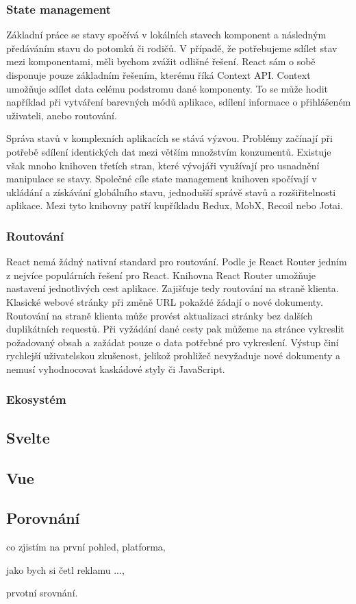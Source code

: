 \subsubsection{State management}

Základní práce se stavy spočívá v lokálních stavech komponent a následným předáváním stavu do potomků či rodičů. 
V případě, že potřebujeme sdílet stav mezi komponentami, měli bychom zvážit odlišné řešení. React sám o sobě disponuje pouze základním řešením, kterému říká Context API. 
Context umožňuje sdílet data celému podstromu dané komponenty. 
To se může hodit například při vytváření barevných módů aplikace, sdílení informace o přihlášeném uživateli, anebo routování.\cite{react}

Správa stavů v komplexních aplikacích se stává výzvou. Problémy začínají při potřebě sdílení identických dat mezi větším množstvím konzumentů. 
Existuje však mnoho knihoven třetích stran, které vývojáři využívají pro usnadnění manipulace se stavy. 
Společné cíle state management knihoven spočívají v ukládání a získávání globálního stavu, jednodušší správě stavů a rozšiřitelnosti aplikace.
Mezi tyto knihovny patří kupříkladu Redux, MobX, Recoil nebo Jotai.\cite{statemanagementreact,reactstatemanagement}

\subsubsection{Routování}

React nemá žádný nativní standard pro routování. Podle \cite{reactbanks} je React Router jedním z nejvíce populárních řešení pro React. 
Knihovna React Router umožňuje nastavení jednotlivých cest aplikace. Zajišťuje tedy routování na straně klienta. 
Klasické webové stránky při změně URL pokaždé žádají o nové dokumenty. Routování na straně klienta může provést aktualizaci stránky bez dalších duplikátních requestů. 
Při vyžádání dané cesty pak můžeme na stránce vykreslit požadovaný obsah a zažádat pouze o data potřebné pro vykreslení. 
Výstup činí rychlejší uživatelskou zkušenost, jelikož prohližeč nevyžaduje nové dokumenty a nemusí vyhodnocovat kaskádové styly či JavaScript.\cite{reactbanks,reactrouter}

\subsubsection{Ekosystém}



\subsection{Svelte}

\subsection{Vue}

\subsection{Porovnání}

\begin{citemize}
	\item co zjistím na první pohled, platforma,
	\item jako bych si četl reklamu ...,
	\item prvotní srovnání.
\end{citemize}
